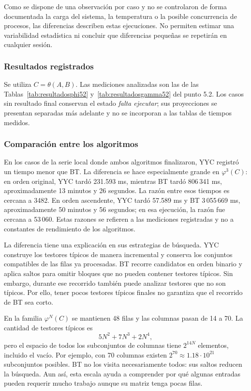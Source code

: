 Como se dispone de una observación por caso y no se controlaron de forma
documentada la carga del sistema, la temperatura o la posible concurrencia
de procesos, las diferencias describen estas ejecuciones. No permiten
estimar una variabilidad estadística ni concluir que diferencias pequeñas
se repetirán en cualquier sesión.

\subsubsection*{Resultados registrados}

Se utiliza $C=\theta(A,B)$. Las mediciones analizadas son las de
las Tablas~\ref{tab:resultadosphi52} y~\ref{tab:resultadosgamma52}
del punto 5.2. Los casos sin resultado final conservan el estado
\emph{falta ejecutar}; sus proyecciones se presentan separadas
más adelante y no se incorporan a las tablas de tiempos medidos.

\subsubsection*{Comparación entre los algoritmos}

En los casos de la serie local donde ambos algoritmos finalizaron, YYC
registró un tiempo menor que BT. La diferencia se hace especialmente
grande en $\varphi^3(C)$: en orden original, YYC tardó 231.593 ms,
mientras BT tardó 806\,341 ms, aproximadamente 13 minutos y 26 segundos.
La razón entre esos tiempos es cercana a 3482. En orden ascendente,
YYC tardó 57.589 ms y BT 3\,055\,669 ms, aproximadamente 50 minutos y
56 segundos; en esa ejecución, la razón fue cercana a 53\,060.
Estas razones se refieren a las mediciones registradas y no a constantes
de rendimiento de los algoritmos.

La diferencia tiene una explicación en sus estrategias de búsqueda.
YYC construye los testores típicos de manera incremental y conserva los
conjuntos compatibles de las filas ya procesadas. BT recorre candidatos
en orden binario y aplica saltos para omitir bloques que no pueden
contener testores típicos. Sin embargo, durante ese recorrido también
puede analizar testores que no son típicos. Por ello, tener pocos
testores típicos finales no garantiza que el recorrido de BT sea corto.

En la familia $\varphi^N(C)$ se mantienen 48 filas y las columnas pasan
de 14 a 70. La cantidad de testores típicos es
\[
5N^2+7N^3+2N^4,
\]
pero el espacio de todos los subconjuntos de columnas tiene
$2^{14N}$ elementos, incluido el vacío. Por ejemplo, con 70 columnas
existen $2^{70}\approx1.18\cdot10^{21}$ subconjuntos posibles. BT no
los visita necesariamente todos: sus saltos reducen la búsqueda. Aun
así, esta escala ayuda a comprender por qué algunas entradas pueden
requerir mucho trabajo aunque su matriz tenga pocas filas.

